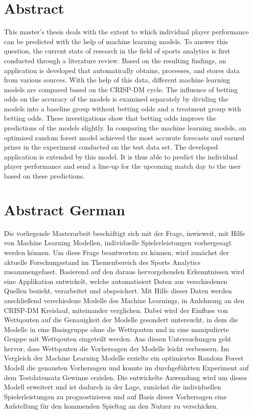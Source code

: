 \chapter*{Abstract}

This master's thesis deals with the extent to which individual player performance can be predicted with the help of machine learning models. To answer this question, the current state of research in the field of sports analytics is first conducted through a literature review. Based on the resulting findings, an application is developed that automatically obtains, processes, and stores data from various sources. With the help of this data, different machine learning models are compared based on the CRISP-DM cycle. The influence of betting odds on the accuracy of the models is examined separately by dividing the models into a baseline group without betting odds and a treatment group with betting odds. These investigations show that betting odds improve the predictions of the models slightly. In comparing the machine learning models, an optimised random forest model achieved the most accurate forecasts and earned prizes in the experiment conducted on the test data set. The developed application is extended by this model. It is thus able to predict the individual player performance and send a line-up for the upcoming match day to the user based on these predictions.

\clearpage \chapter*{Abstract German}

Die vorliegende Masterarbeit beschäftigt sich mit der Frage, inwieweit, mit Hilfe von Machine Learning Modellen, individuelle Spielerleistungen vorhergesagt werden können. Um diese Frage beantworten zu können, wird zunächst der aktuelle Forschungsstand im Themenbereich des Sports Analytics zusammengefasst. Basierend auf den daraus hervorgehenden Erkenntnissen wird eine Applikation entwickelt, welche automatisiert Daten aus verschiedenen Quellen bezieht, verarbeitet und abspeichert. Mit Hilfe dieser Daten werden anschließend verschiedene Modelle des Machine Learnings, in Anlehnung an den CRISP-DM Kreislauf, miteinander verglichen. Dabei wird der Einfluss von Wettqouten auf die Genauigkeit der Modelle gesondert untersucht, in dem die Modelle in eine Basisgruppe ohne die Wettqouten und in eine manipulierte Gruppe mit Wettqouten eingeteilt werden. Aus diesen Untersuchungen geht hervor, dass Wettqouten die Vorhersagen der Modelle leicht verbessern. Im Vergleich der Machine Learning Modelle erzielte ein optimiertes Random Forest Modell die genausten Vorhersagen und konnte im durchgeführten Experiment auf dem Testdatensatz Gewinne erzielen. Die entwickelte Anwendung wird um dieses Modell erweitert und ist dadurch in der Lage, zunächst die individuellen Spielerleistungen zu prognostizieren und auf Basis dieser Vorhersagen eine Aufstellung für den kommenden Spieltag an den Nutzer zu verschicken.

